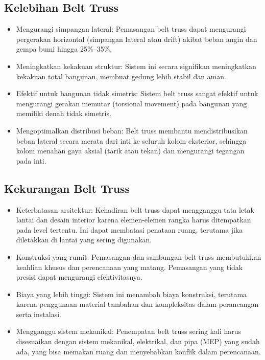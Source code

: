 \documentclass[../modul_skb.tex]{subfiles}
\begin{document}
\subsection{Kelebihan Belt Truss}%
\label{sub:Kelebihan Belt Truss}


\begin{itemize}
	\item Mengurangi simpangan lateral: Pemasangan belt truss dapat mengurangi pergerakan horizontal (simpangan lateral atau drift) akibat beban angin dan gempa bumi hingga 25\%–35\%.
	\item Meningkatkan kekakuan struktur: Sistem ini secara signifikan meningkatkan kekakuan total bangunan, membuat gedung lebih stabil dan aman.
	\item Efektif untuk bangunan tidak simetris: Sistem belt truss sangat efektif untuk mengurangi gerakan memutar (torsional movement) pada bangunan yang memiliki denah tidak simetris.
	\item Mengoptimalkan distribusi beban: Belt truss membantu mendistribusikan beban lateral secara merata dari inti ke seluruh kolom eksterior, sehingga kolom menahan gaya aksial (tarik atau tekan) dan mengurangi tegangan pada inti.
\end{itemize}
\subsection{Kekurangan Belt Truss}%
\label{sub:Kekurangan Belt Truss}
\begin{itemize}
	\item Keterbatasan arsitektur: Kehadiran belt truss dapat mengganggu tata letak lantai dan desain interior karena elemen-elemen rangka harus ditempatkan pada level tertentu. Ini dapat membatasi penataan ruang, terutama jika diletakkan di lantai yang sering digunakan.
	\item Konstruksi yang rumit: Pemasangan dan sambungan belt truss membutuhkan keahlian khusus dan perencanaan yang matang. Pemasangan yang tidak presisi dapat mengurangi efektivitasnya.
	\item Biaya yang lebih tinggi: Sistem ini menambah biaya konstruksi, terutama karena penggunaan material tambahan dan kompleksitas dalam perancangan serta instalasi.
	\item Mengganggu sistem mekanikal: Penempatan belt truss sering kali harus disesuaikan dengan sistem mekanikal, elektrikal, dan pipa (MEP) yang sudah ada, yang bisa memakan ruang dan menyebabkan konflik dalam perencanaan.
\end{itemize}







\end{document}
